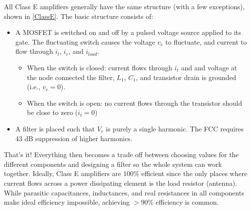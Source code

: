 \documentclass[10pt,letterpaper]{article}
\begin{document}
All Class E amplifiers generally have the same structure (with a few exceptions), shown in \ref{ClassE}. The basic structure consists of:
\begin{itemize}
\item A MOSFET is switched on and off by a pulsed voltage source applied to its gate. The fluctuating switch causes the voltage $v_c$ to fluctuate, and current to flow through $i_l$, $i_c$, and $i_{load}$.
\begin{itemize}
\item When the switch is closed: current flows through $i_t$ and and voltage at the node connected the filter, $L_1$, $C_1$, and transistor drain is grounded (i.e., $v_c=0$).
\item When the switch is open: no current flows through the transistor should be close to zero ($i_t=0$)
\end{itemize}
\item A filter is placed such that $V_r$ is purely a single harmonic. The FCC requires 43 dB suppression of higher harmonics.
\end{itemize}

That's it! Everything then becomes a trade off between choosing values for the different components and designing a filter so the whole system can work together. Ideally, Class E amplifiers are 100\% efficient since the only places where current flows across a power dissipating element is the load resistor (antenna). While parasitic capacitances, inductances, and real resistances in all components make ideal efficiency impossible, achieving $>90\%$ efficiency is common.
\end{document}
